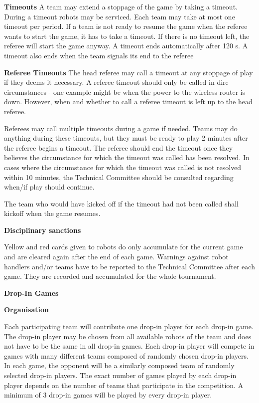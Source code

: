 \bigskip

{\bfseries Timeouts}
A team may extend a stoppage of the game by taking a timeout. During a timeout
robots may be serviced. Each team may take at most one timeout per period. If a team is not ready to resume the game when the referee wants to start the game, it has to take a timeout. If there is no timeout left, the referee will start
the game anyway. A timeout ends automatically after 120 s. A timeout also ends when the team signals its end to the referee

\bigskip

{\bfseries Referee Timeouts}
The head referee may call a timeout at any stoppage of play if they deems it necessary. A referee timeout should only be called in dire circumstances - one example might be when the power to the wireless router is down. However, when and whether to call a referee timeout is left up to the head referee.

Referees may call multiple timeouts during a game if needed. Teams may do anything during these timeouts, but they must be ready to play 2 minutes after the referee begins a timeout. The referee should end the timeout once they believes the circumstance for which the timeout was called has been resolved. In cases where the circumstance for which the timeout was called is not resolved within 10 minutes, the Technical Committee should be consulted regarding when/if play should continue.

The team who would have kicked off if the timeout had not been called shall kickoff when the game resumes.

\bigskip

{\bfseries Disciplinary sanctions}

Yellow and red cards given to robots do only accumulate for the current game and are cleared again after the end of each game. Warnings against robot handlers and/or teams have to be reported to the Technical Committee after each game. They are recorded and accumulated for the whole tournament. 




\bigskip

{\bfseries Drop-In Games}

\headlinebox

{\bfseries Organisation}

Each participating team will contribute one drop-in player for each drop-in game. The drop-in player may be chosen from all available robots of the team and does not have to be the same in all drop-in games. Each drop-in player will compete in games with many different teams composed of randomly chosen drop-in players. In each game, the opponent will  be a similarly composed team of randomly selected drop-in players. The exact number of games played by each drop-in player depends on the number of teams that participate in the competition. A minimum of 3 drop-in games will be played by every drop-in player.

